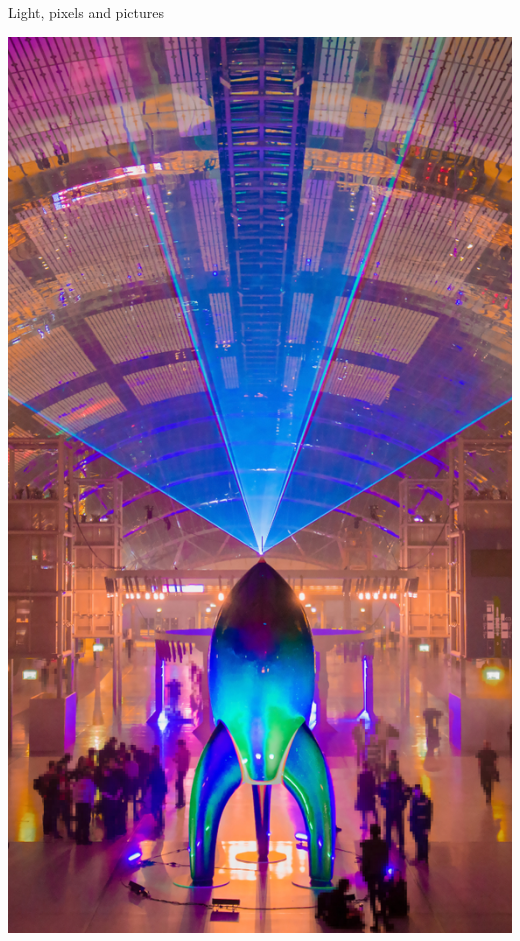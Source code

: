 \begin{frame}{Light, pixels and pictures}
\begin{minipage}{0.25\textwidth}
  \includegraphics[width=\textwidth]{slides/graphics-theory/ccc-rocket.jpg}
  \end{minipage}
\end{frame}

